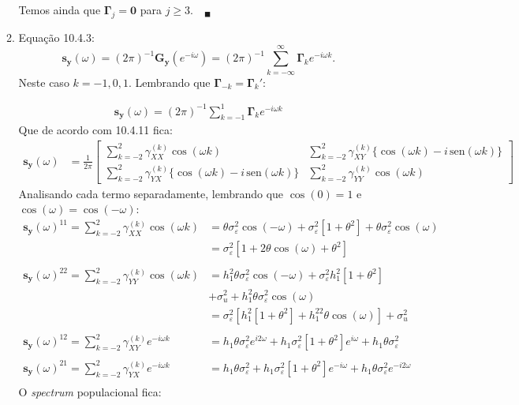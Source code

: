 \begin{enumerate}
\begin{enumerate}
  Temos ainda que $\boldsymbol{\Gamma}_j=\mathbf{0}$ para $j\geqslant3$.$\quad_\blacksquare$
  
  
  \item %
  
  Equação 10.4.3: $$\mathbf{s}_{\mathbf{y}}(\omega)=(2\pi)^{-1}\mathbf{G}_{\mathbf{y}}(e^{-i\omega})=(2\pi)^{-1}\sum\limits_{k=-\infty}^{\infty}\mathbf{\Gamma}_ke^{-i\omega k}.$$
  Neste caso $k=-1,0,1$. Lembrando que $\boldsymbol{\Gamma}_{-k}=\boldsymbol{\Gamma}_{k}'$:
  
  	
  	
  	
  \begin{align*}\mathbf{s}_{\mathbf{y}}(\omega)=(2\pi)^{-1}\sum\limits_{k=-1}^1\boldsymbol{\Gamma}_ke^{-i\omega k}  
  \end{align*}
		Que de acordo com 10.4.11 fica:
		\begin{align*}
			\mathbf{s}_{\mathbf{y}}(\omega)&=\frac{1}{2\pi}\begin{bmatrix}
				\sum\limits_{k=-2}^2\gamma_{XX}^{(k)}\cos(\omega k)&\sum\limits_{k=-2}^2\gamma_{XY}^{(k)}\{\cos(\omega k)-i\,\text{sen}(\omega k)\}\\
				\sum\limits_{k=-2}^2\gamma_{YX}^{(k)}\{\cos(\omega k)-i\,\text{sen}(\omega k)\}&\sum\limits_{k=-2}^2\gamma_{YY}^{(k)}\cos(\omega k)
			\end{bmatrix}
		\end{align*}
	Analisando cada termo separadamente, lembrando que $\cos(0)=1$ e $\cos(\omega)=\cos(-\omega)$:
	\begin{align*}
	\mathbf{s}_{\mathbf{y}}(\omega)^{11}=	\sum\limits_{k=-2}^2\gamma_{XX}^{(k)}\cos(\omega k)&=\theta\sigma^2_{\varepsilon}\cos(-\omega)+\sigma^2_{\varepsilon}[1+\theta^2]+\theta\sigma^2_{\varepsilon}\cos(\omega)\\
		&=\sigma^2_{\varepsilon}[1+2\theta\cos(\omega)+\theta^2]\\
		\\
		\mathbf{s}_{\mathbf{y}}(\omega)^{22}=\sum\limits_{k=-2}^2\gamma_{YY}^{(k)}\cos(\omega k)&=h_1^2\theta\sigma^2_{\varepsilon}\cos(-\omega)+\sigma^2_{\varepsilon}h_1^2[1+\theta^2]\\
		&+\sigma^2_u+h_1^2\theta\sigma^2_{\varepsilon}\cos(\omega)\\
		&=\sigma^2_{\varepsilon}[h_1^2[1+\theta^2]+h_1^22\theta\cos(\omega)]+\sigma^2_u\\
		\\
		\mathbf{s}_{\mathbf{y}}(\omega)^{12}=\sum\limits_{k=-2}^2\gamma_{XY}^{(k)}e^{-i\omega k}&=h_1\theta\sigma^2_{\varepsilon}e^{i2\omega}
		+h_1\sigma^2_{\varepsilon}[1+\theta^2]e^{i\omega}+h_1\theta\sigma^2_{\varepsilon}\\
		\\
		\mathbf{s}_{\mathbf{y}}(\omega)^{21}=\sum\limits_{k=-2}^2\gamma_{YX}^{(k)}e^{-i\omega k}&=h_1\theta\sigma^2_{\varepsilon}+h_1\sigma^2_{\varepsilon}[1+\theta^2]e^{-i\omega}+h_1\theta\sigma^2_{\varepsilon}e^{-i2\omega}\\
	\end{align*}
	O \emph{spectrum} populacional fica:
	

\end{enumerate}
\end{enumerate}
